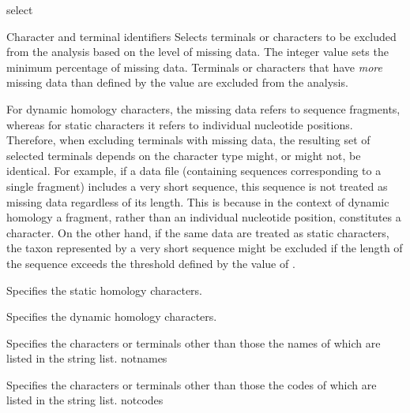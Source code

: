 \begin{command}{select}{}
\begin{arguments}
\begin{argumentgroup}{Character and terminal identifiers}
                {Selects terminals or characters to be excluded from the analysis
                based on the level of missing data. The
                integer value sets the minimum percentage of missing
                data. Terminals or characters that have \emph{more} missing data
                than defined by the value are excluded from the analysis.}
                {}
                \begin{statement}
                For dynamic homology characters, the missing data refers to
                sequence fragments, whereas for static characters it refers to
                individual nucleotide positions. Therefore, when excluding
                terminals with missing data, the resulting set of selected
                terminals depends on the character type might, or
                might not, be identical. For example, if a data file (containing
                sequences corresponding to a single fragment) includes
                a very short sequence, this sequence is not treated as
                missing data regardless of its length. This is because in the
                context of dynamic homology a fragment, rather than an
                individual nucleotide position, constitutes a character.
                On the other hand, if the same data are treated as static characters,
                the taxon represented by a very short sequence
                might be excluded if the length of the sequence exceeds the
                threshold defined by the value of .
                \end{statement}

                {Specifies the static homology characters.}
                {}

                {Specifies the dynamic homology characters.}
                {}

                {Specifies the characters or terminals other than those the
                names of which are listed in the string list.}
                {notnames}

                {Specifies the characters or terminals other than those the
                codes of which are listed in the string list.}
                {notcodes}


\end{argumentgroup}
\end{arguments}
\end{command}
